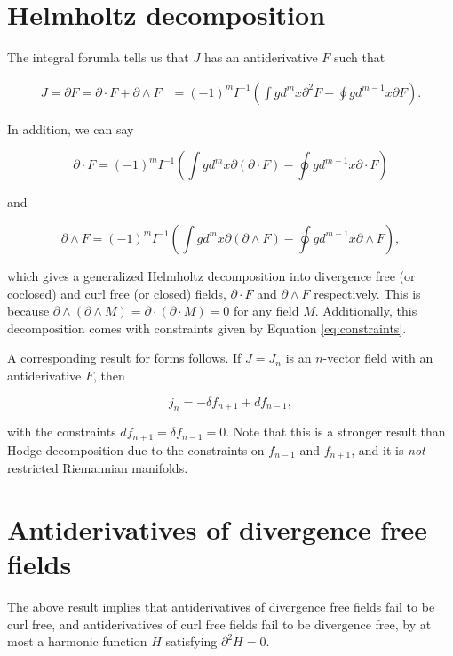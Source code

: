 \documentclass{article}
\begin{document}
\section{Helmholtz decomposition}

The integral forumla tells us that $J$ has an antiderivative $F$ such that

\begin{align}
  J = \partial F = \partial \cdot F + \partial \wedge F &= (-1)^m I^{-1} \left(\int g d^{m}x \partial^2 F - \oint g d^{m-1}x \partial F\right).\label{eq:helmholtz}
\end{align}

In addition, we can say

\begin{equation}
  \partial \cdot F = (-1)^m I^{-1} \left(\int g d^{m}x \partial (\partial \cdot F) - \oint g d^{m-1}x \partial \cdot F\right)
\end{equation}

and

\begin{equation}
  \partial \wedge F = (-1)^m I^{-1} \left(\int g d^{m}x \partial (\partial \wedge F) - \oint g d^{m-1}x \partial \wedge F\right),
\end{equation}

which gives a generalized Helmholtz decomposition into divergence free (or coclosed) and curl free (or closed) fields, $\partial \cdot F$ and $\partial \wedge F$ respectively. This is because $\partial \wedge (\partial \wedge M) = \partial \cdot (\partial \cdot M) = 0$ for any field $M$. Additionally, this decomposition comes with constraints given by Equation \ref{eq:constraints}.

A corresponding result for forms follows. If $J = J_n$ is an $n$-vector field with an antiderivative $F$, then

\begin{equation}
  j_n = -\delta f_{n+1} + d f_{n-1},
\end{equation}

with the constraints $df_{n+1}=\delta f_{n-1} = 0$. Note that this is a stronger result than Hodge decomposition due to the constraints on $f_{n-1}$ and $f_{n+1}$, and it is \emph{not} restricted Riemannian manifolds.

\section{Antiderivatives of divergence free fields} The above result implies that antiderivatives of divergence free fields fail to be curl free, and antiderivatives of curl free fields fail to be divergence free, by at most a harmonic function $H$ satisfying $\partial^2 H = 0$.
\end{document}
